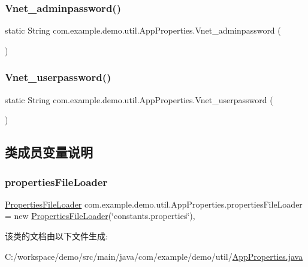 \subsubsection{\texorpdfstring{Vnet\+\_\+adminpassword()}{Vnet\_adminpassword()}}
{\footnotesize\ttfamily static String com.\+example.\+demo.\+util.\+App\+Properties.\+Vnet\+\_\+adminpassword (\begin{DoxyParamCaption}{ }\end{DoxyParamCaption})\hspace{0.3cm}{\ttfamily [static]}}

\mbox{\label{classcom_1_1example_1_1demo_1_1util_1_1_app_properties_af7e86958e5c688e59bdd6557ac24fe89}} 
\subsubsection{\texorpdfstring{Vnet\+\_\+userpassword()}{Vnet\_userpassword()}}
{\footnotesize\ttfamily static String com.\+example.\+demo.\+util.\+App\+Properties.\+Vnet\+\_\+userpassword (\begin{DoxyParamCaption}{ }\end{DoxyParamCaption})\hspace{0.3cm}{\ttfamily [static]}}



\subsection{类成员变量说明}
\mbox{\label{classcom_1_1example_1_1demo_1_1util_1_1_app_properties_a7f234aa2b44697f33883cbccbdea8b75}} 
\subsubsection{\texorpdfstring{properties\+File\+Loader}{propertiesFileLoader}}
{\footnotesize\ttfamily \mbox{\hyperlink{classcom_1_1example_1_1demo_1_1util_1_1_properties_file_loader}{Properties\+File\+Loader}} com.\+example.\+demo.\+util.\+App\+Properties.\+properties\+File\+Loader = new \mbox{\hyperlink{classcom_1_1example_1_1demo_1_1util_1_1_properties_file_loader}{Properties\+File\+Loader}}(\char`\"{}constants.\+properties\char`\"{})\hspace{0.3cm}{\ttfamily [static]}, {\ttfamily [private]}}



该类的文档由以下文件生成\+:\begin{DoxyCompactItemize}
\item 
C\+:/workspace/demo/src/main/java/com/example/demo/util/\mbox{\hyperlink{_app_properties_8java}{App\+Properties.\+java}}\end{DoxyCompactItemize}
